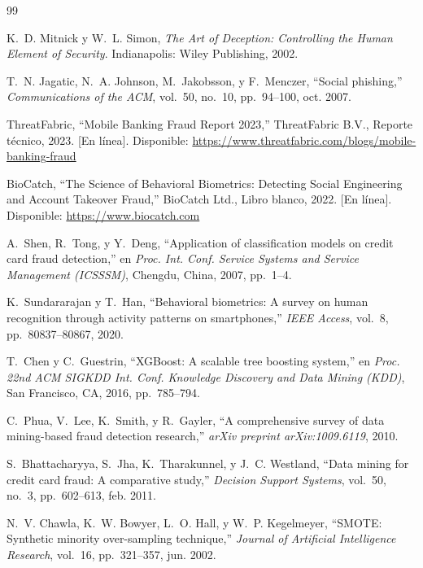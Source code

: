 \documentclass[journal]{IEEEtran}
\begin{document}

\begin{thebibliography}{99}

K.~D. Mitnick y W.~L. Simon,
\textit{The Art of Deception: Controlling the Human Element of Security}.
Indianapolis: Wiley Publishing, 2002.

T.~N. Jagatic, N.~A. Johnson, M.~Jakobsson, y F.~Menczer,
``Social phishing,''
\textit{Communications of the ACM}, vol.~50, no.~10, pp.~94--100, oct. 2007.

ThreatFabric,
``Mobile Banking Fraud Report 2023,''
ThreatFabric B.V., Reporte técnico, 2023.
[En línea]. Disponible: \url{https://www.threatfabric.com/blogs/mobile-banking-fraud}

BioCatch,
``The Science of Behavioral Biometrics: Detecting Social Engineering and
Account Takeover Fraud,''
BioCatch Ltd., Libro blanco, 2022.
[En línea]. Disponible: \url{https://www.biocatch.com}

A.~Shen, R.~Tong, y Y.~Deng,
``Application of classification models on credit card fraud detection,''
en \textit{Proc. Int. Conf. Service Systems and Service Management (ICSSSM)},
Chengdu, China, 2007, pp.~1--4.

K.~Sundararajan y T.~Han,
``Behavioral biometrics: A survey on human recognition through activity
patterns on smartphones,''
\textit{IEEE Access}, vol.~8, pp.~80837--80867, 2020.

T.~Chen y C.~Guestrin,
``XGBoost: A scalable tree boosting system,''
en \textit{Proc. 22nd ACM SIGKDD Int. Conf. Knowledge Discovery and Data Mining
(KDD)}, San Francisco, CA, 2016, pp.~785--794.

C.~Phua, V.~Lee, K.~Smith, y R.~Gayler,
``A comprehensive survey of data mining-based fraud detection research,''
\textit{arXiv preprint arXiv:1009.6119}, 2010.

S.~Bhattacharyya, S.~Jha, K.~Tharakunnel, y J.~C. Westland,
``Data mining for credit card fraud: A comparative study,''
\textit{Decision Support Systems}, vol.~50, no.~3, pp.~602--613, feb. 2011.

N.~V. Chawla, K.~W. Bowyer, L.~O. Hall, y W.~P. Kegelmeyer,
``SMOTE: Synthetic minority over-sampling technique,''
\textit{Journal of Artificial Intelligence Research}, vol.~16, pp.~321--357,
jun. 2002.


\end{thebibliography}
\end{document}
